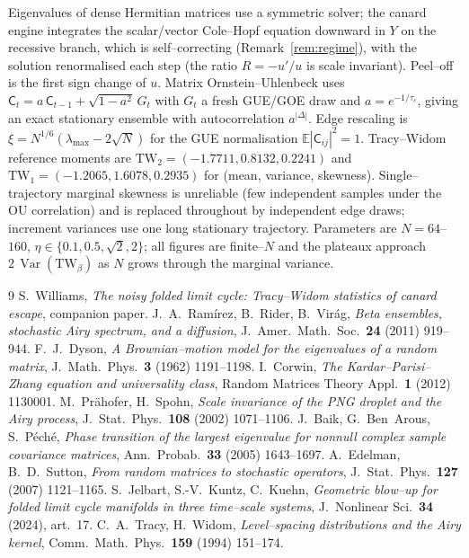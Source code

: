 \documentclass[11pt,reqno]{amsart}
\theoremstyle{plain}
\theoremstyle{definition}
\theoremstyle{remark}
\newcommand{\TW}{\mathrm{TW}}
\newcommand{\Var}{\operatorname{Var}}
\newcommand{\Cmat}{\mathsf{C}}
\begin{document}
Eigenvalues of dense Hermitian matrices use a symmetric solver; the canard engine integrates
the scalar/vector Cole--Hopf equation downward in $Y$ on the recessive branch, which is
self--correcting (Remark~\ref{rem:regime}), with the solution renormalised each step (the
ratio $R=-u'/u$ is scale invariant). Peel--off is the first sign change of $u$. Matrix
Ornstein--Uhlenbeck uses $\Cmat_{t}=a\,\Cmat_{t-1}+\sqrt{1-a^2}\,G_t$ with $G_t$ a fresh
GUE/GOE draw and $a=e^{-1/\tau_c}$, giving an exact stationary ensemble with autocorrelation
$a^{|\Delta|}$. Edge rescaling is $\xi=N^{1/6}(\lambda_{\max}-2\sqrt N)$ for the GUE
normalisation $\mathbb E|\Cmat_{ij}|^2=1$. Tracy--Widom reference moments are
$\TW_2=(-1.7711,0.8132,0.2241)$ and $\TW_1=(-1.2065,1.6078,0.2935)$ for
(mean, variance, skewness). Single--trajectory marginal skewness is unreliable (few
independent samples under the OU correlation) and is replaced throughout by independent edge
draws; increment variances use one long stationary trajectory. Parameters are $N=64$--$160$,
$\eta\in\{0.1,0.5,\sqrt2,2\}$; all figures are finite--$N$ and the plateaux approach
$2\,\Var(\TW_\beta)$ as $N$ grows through the marginal variance.

\begin{thebibliography}{9}
 S.~Williams, \emph{The noisy folded limit cycle: Tracy--Widom statistics of
canard escape}, companion paper.
 J.~A.~Ram\'irez, B.~Rider, B.~Vir\'ag, \emph{Beta ensembles, stochastic Airy
spectrum, and a diffusion}, J.~Amer.\ Math.\ Soc.\ \textbf{24} (2011) 919--944.
 F.~J.~Dyson, \emph{A Brownian--motion model for the eigenvalues of a random
matrix}, J.~Math.\ Phys.\ \textbf{3} (1962) 1191--1198.
 I.~Corwin, \emph{The Kardar--Parisi--Zhang equation and universality
class}, Random Matrices Theory Appl.\ \textbf{1} (2012) 1130001.
 M.~Pr\"ahofer, H.~Spohn, \emph{Scale invariance of the PNG droplet
and the Airy process}, J.~Stat.\ Phys.\ \textbf{108} (2002) 1071--1106.
 J.~Baik, G.~Ben~Arous, S.~P\'ech\'e, \emph{Phase transition of the largest
eigenvalue for nonnull complex sample covariance matrices}, Ann.\ Probab.\ \textbf{33}
(2005) 1643--1697.
 A.~Edelman, B.~D.~Sutton, \emph{From random matrices to stochastic
operators}, J.~Stat.\ Phys.\ \textbf{127} (2007) 1121--1165.
 S.~Jelbart, S.-V.~Kuntz, C.~Kuehn, \emph{Geometric blow--up for folded limit
cycle manifolds in three time--scale systems}, J.~Nonlinear Sci.\ \textbf{34} (2024), art.\
17.
 C.~A.~Tracy, H.~Widom, \emph{Level--spacing distributions and the Airy kernel},
Comm.\ Math.\ Phys.\ \textbf{159} (1994) 151--174.
\end{thebibliography}
\end{document}

